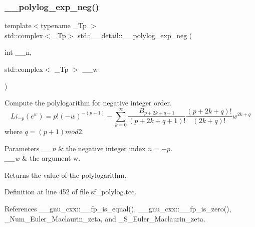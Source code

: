 \mbox{\label{namespacestd_1_1____detail_a313ae48e1c4ed3c5296c8e45614af3d5}} 
\subsubsection{\texorpdfstring{\+\_\+\+\_\+polylog\+\_\+exp\+\_\+neg()}{\_\_polylog\_exp\_neg()}\hspace{0.1cm}{\footnotesize\ttfamily [2/2]}}
{\footnotesize\ttfamily template$<$typename \+\_\+\+Tp $>$ \\
std\+::complex$<$\+\_\+\+Tp$>$ std\+::\+\_\+\+\_\+detail\+::\+\_\+\+\_\+polylog\+\_\+exp\+\_\+neg (\begin{DoxyParamCaption}\item[{int}]{\+\_\+\+\_\+n,  }\item[{std\+::complex$<$ \+\_\+\+Tp $>$}]{\+\_\+\+\_\+w }\end{DoxyParamCaption})}

Compute the polylogarithm for negative integer order. \[ Li_{-p}(e^w) = p!(-w)^{-(p+1)} - \sum_{k=0}^{\infty} \frac{B_{p+2k+q+1}}{(p+2k+q+1)!} \frac{(p+2k+q)!}{(2k+q)!}w^{2k+q} \] where $ q = (p+1) mod 2 $.


\begin{DoxyParams}{Parameters}
{\em \+\_\+\+\_\+n} & the negative integer index $ n = -p $. \\
\hline
{\em \+\_\+\+\_\+w} & the argument w. \\
\hline
\end{DoxyParams}
\begin{DoxyReturn}{Returns}
the value of the polylogarithm. 
\end{DoxyReturn}


Definition at line 452 of file sf\+\_\+polylog.\+tcc.



References \+\_\+\+\_\+gnu\+\_\+cxx\+::\+\_\+\+\_\+fp\+\_\+is\+\_\+equal(), \+\_\+\+\_\+gnu\+\_\+cxx\+::\+\_\+\+\_\+fp\+\_\+is\+\_\+zero(), \+\_\+\+Num\+\_\+\+Euler\+\_\+\+Maclaurin\+\_\+zeta, and \+\_\+\+S\+\_\+\+Euler\+\_\+\+Maclaurin\+\_\+zeta.

\mbox{\label{namespacestd_1_1____detail_a02b154619b2e4d0bf50dc303370d74cd}} 
